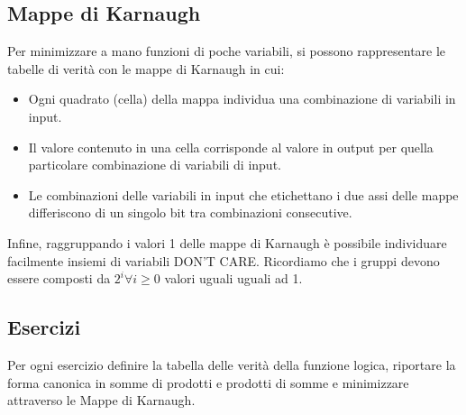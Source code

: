 \documentclass[tikz, border=2mm]{article}
\begin{document}
\subsection{Mappe di Karnaugh}
Per minimizzare a mano funzioni di poche variabili, si possono rappresentare le tabelle di verità con le mappe di Karnaugh in cui:
\begin{itemize}
    \item Ogni quadrato (cella) della mappa individua una combinazione di variabili in input.
    \item Il valore contenuto in una cella corrisponde al valore in output per quella particolare combinazione di variabili di input.
    \item Le combinazioni delle variabili in input che etichettano i due assi delle mappe differiscono di un singolo bit tra combinazioni consecutive.
\end{itemize}
Infine, raggruppando i valori 1 delle mappe di Karnaugh è possibile individuare facilmente insiemi di variabili DON'T CARE. Ricordiamo che i gruppi devono essere composti da $2^i \forall  i \geq 0$ valori uguali uguali ad 1.

\subsection{Esercizi}

Per ogni esercizio definire la tabella delle verità della funzione logica, riportare la forma canonica in somme di prodotti e prodotti di somme e minimizzare attraverso le Mappe di Karnaugh.
\end{document}
